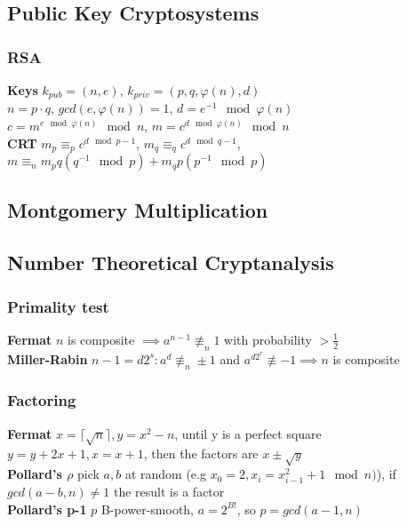 \documentclass[twoside, 11pt]{article}
\begin{document}
        

        \subsection*{Public Key Cryptosystems}
            \subsubsection*{RSA}
                \textbf{Keys} $k_{pub} = (n, e)$, $k_{priv}=(p, q, \varphi(n), d)$ \\
                $n=p\cdot q$, $gcd(e, \varphi(n))=1$, $d=e^{-1}\mod{\varphi(n)}$ \\
                $c=m^{e \mod{\varphi(n)}} \mod{n}$, $m=c^{d \mod{\varphi(n)}} \mod{n}$ \\
                \textbf{CRT} $m_{p} \equiv_{p} c^{d \mod{p-1}}$, $m_{q} \equiv_{q} c^{d \mod{q-1}}$, $m \equiv_{n} m_{p}q(q^{-1}\mod{p}) + m_{q}p(p^{-1}\mod{p})$

        \subsection*{Montgomery Multiplication}

        \subsection*{Number Theoretical Cryptanalysis}
            \subsubsection*{Primality test}
                \textbf{Fermat} $n$ is composite $\implies a^{n-1} \not\equiv_{n} 1$ with probability $> \frac{1}{2}$ \\ 
                \textbf{Miller-Rabin} $n-1=d2^{s}: a^{d} \not\equiv_{n} \pm 1$ and $a^{d2^{r}} \not\equiv -1 \implies n$ is composite \\
            \subsubsection*{Factoring}
                \textbf{Fermat} $x = \lceil \sqrt{n} \rceil, y=x^{2}-n$, until y is a perfect square $y=y+2x+1, x = x+1$, then the factors are $x \pm \sqrt{y}$ \\
                \textbf{Pollard's \boldmath $\rho$} pick $a, b$ at random (e.g $x_{0}=2, x_{i}=x_{i-1}^{2} + 1 \mod{n})$), if $gcd(a-b, n) \neq 1$ the result is a factor \\
                \textbf{Pollard's p-1} $p$ B-power-smooth, $a=2^{B!}$, so $p=gcd(a-1, n)$
\end{document}
